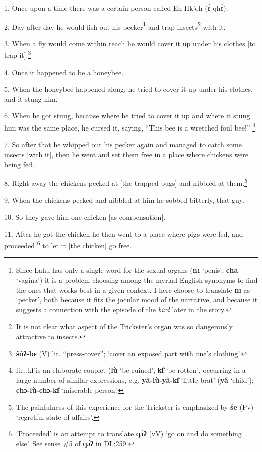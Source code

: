 \setcounter{footnote}{0}

1. Once upon a time there was a certain person called Eh-Hk'eh (ɛ̀-qhɛ̀).

2. Day after day he would fish out his pecker\footnote{Since Lahu has only a single word for the sexual organs (\textbf{nī} `penis', \textbf{cha} `vagina') it is a problem choosing among the myriad English synonyms to find the ones that works best in a given context. I here choose to translate \textbf{nī} as `pecker', both because it fits the jocular mood of the narrative, and because it suggests a connection with the episode of the \textit{bird} later in the story.} and trap insects\footnote{It is not clear what aspect of the Trickster's organ was so dangerously attractive to insects.} with it.

3. When a fly would come within reach he would cover it up under his clothes [to
trap it].\footnote{\textbf{šôʔ-bɛ} (V) lit. ``press-cover''; `cover an exposed part with one's clothing'.}

4. Once it happened to be a honeybee.

5. When the honeybee happened along, he tried to cover it up under his clothes,
and it stung him.

6. When he got stung, because where he tried to cover it up and where it stung
him was the same place, he cursed it, saying, ``This bee is a wretched foul bee!''
\footnote{lù...kɨ̂ is an elaborate couplet (\textbf{lù} `be ruined', \textbf{kɨ̂} `be rotten', occurring in a large number of similar expressions, e.g. \textbf{yâ-lù-yâ-kɨ̂} `little brat' (\textbf{yâ} `child'); \textbf{chɔ-lù-chɔ-kɨ̂} `miserable person'.}

7. So after that he whipped out his pecker again and managed to catch some insects
[with it], then he went and set them free in a place where chickens were being
fed.

8. Right away the chickens pecked at [the trapped bugs] and nibbled at them.\footnote{The painfulness of this experience for the Trickster is emphasized by \textbf{šē} (Pv) `regretful state of affairs'.}

9. When the chickens pecked and nibbled at him he sobbed bitterly, that guy.

10. So they gave him one chicken [as compensation].

11. After he got the chicken he then went to a place where pigs were fed, and proceeded
\footnote{`Proceeded' is an attempt to translate \textbf{qɔ̀ʔ} (vV) `go on and do something else'. See sense \#5 of \textbf{qɔ̀ʔ} in DL:259.} to let it [the chicken] go free.

